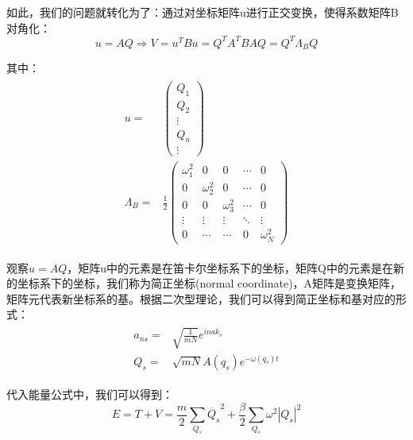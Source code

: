 \documentclass{ctexart}
\begin{document}
            如此，我们的问题就转化为了：通过对坐标矩阵u进行正交变换，使得系数矩阵B对角化：
            \begin{equation}
                u=AQ\Rightarrow V=u^TBu=Q^TA^TBAQ=Q^T\Lambda_BQ
            \end{equation}
            
            其中：
            \begin{align}
                \begin{split}
                    u=&\begin{pmatrix}
                         Q_1\\
                         Q_2\\
                         \vdots\\
                         Q_n\\
                         \vdots
                    \end{pmatrix}\\
                    \Lambda_B=&\frac{1}{2}\begin{pmatrix}
                        \omega^2_1 & 0 & 0 & \cdots & 0\\
                        0 & \omega^2_2 & 0 & \cdots & 0\\
                        0 & 0 & \omega^2_3 & \cdots & 0\\
                        \vdots & \vdots & \vdots & \ddots & \vdots\\
                        0 & \cdots & \cdots & 0 & \omega_N^2 
                    \end{pmatrix}
                \end{split}
            \end{align}
            
            观察$u=AQ$，矩阵u中的元素是在笛卡尔坐标系下的坐标，矩阵Q中的元素是在新的坐标系下的坐标，我们称为简正坐标(normal coordinate)，A矩阵是变换矩阵，矩阵元代表新坐标系的基。根据二次型理论，我们可以得到简正坐标和基对应的形式：
            \begin{align}
                \begin{split}
                    a_{ns}=&\sqrt{\frac{1}{mN}}e^{inak_s}\\
                    Q_s=&\sqrt{mN} A(q_s) e^{-\omega(q_s)t}
                \end{split}
            \end{align}

            代入能量公式中，我们可以得到：
            \begin{equation}
                E=T+V=\frac{m}{2}\sum_{Q_s}\dot{Q_s}^2+\frac{\beta}{2}\sum_{Q_s}\omega^2|Q_s|^2
            \end{equation}
            
\end{document}
